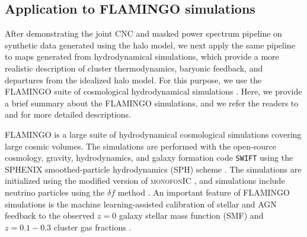 \documentclass[aps,prd,twocolumn,superscriptaddress,nofootinbib,floatfix]{revtex4-2}
\begin{document}
\subsection{Application to FLAMINGO simulations}
\label{sec:methods_flamingo}
After demonstrating the joint CNC and masked power spectrum pipeline on synthetic data generated using the halo model, we next apply the same pipeline to maps generated from hydrodynamical simulations, which provide a more realistic description of cluster thermodynamics, baryonic feedback, and departures from the idealized halo model. For this purpose, we use the FLAMINGO suite of cosmological hydrodynamical simulations \citep{Schaye2023,Kugel2023}. Here, we provide a brief summary about the FLAMINGO simulations, and we refer the readers to \citet{Schaye2023} and \citet{Kugel2023} for more detailed descriptions. 

FLAMINGO is a large suite of hydrodynamical cosmological simulations covering large cosmic volumes. The simulations are performed with the open-source cosmology, gravity, hydrodynamics, and galaxy formation code \texttt{SWIFT} using the SPHENIX smoothed-particle hydrodynamics (SPH) scheme \citep{Schaller2024,Borrow2022}. The simulations are initialized using the modified version of \textsc{monofonIC} \citep{Hahn2021}, and simulations include neutrino particles using the $\delta f$ method \citep{Elbers2021}. An important feature of FLAMINGO simulations is the machine learning-assisted calibration of stellar and AGN feedback to the observed $z=0$ galaxy stellar mass function (SMF) and $z=0.1-0.3$ cluster gas fractions \citep{Kugel2023}. 
\end{document}
